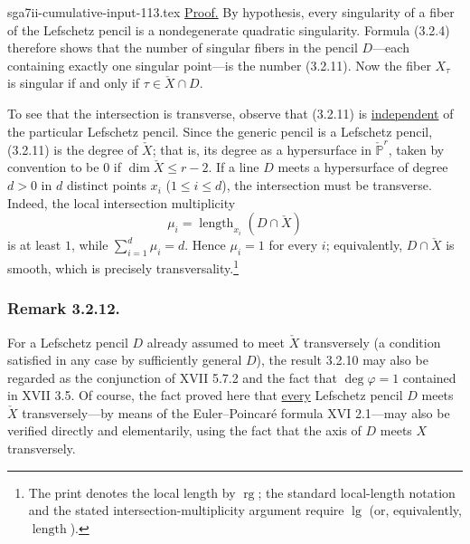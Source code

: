 \begin{filecontents*}{sga7ii-cumulative-input-113.tex}
\underline{Proof.}
By hypothesis, every singularity of a fiber of the Lefschetz pencil is a
nondegenerate quadratic singularity.  Formula (3.2.4) therefore shows that
the number of singular fibers in the pencil $D$---each containing exactly
one singular point---is the number (3.2.11).  Now the fiber $X_\tau$ is
singular if and only if $\tau\in\check X\cap D$.

To see that the intersection is transverse, observe that (3.2.11) is
\underline{independent} of the particular Lefschetz pencil.  Since the
generic pencil is a Lefschetz pencil, (3.2.11) is the degree of $\check X$;
that is, its degree as a hypersurface in $\check{\mathbb P}^{r}$, taken by
convention to be $0$ if $\dim\check X\le r-2$.  If a line $D$ meets a
hypersurface of degree $d>0$ in $d$ distinct points $x_i$
($1\le i\le d$), the intersection must be transverse.  Indeed, the local
intersection multiplicity
\[
\mu_i=\operatorname{length}_{x_i}(D\cap\check X)
\]
is at least $1$, while $\sum_{i=1}^d\mu_i=d$.  Hence $\mu_i=1$ for every
$i$; equivalently, $D\cap\check X$ is smooth, which is precisely
transversality.\footnote{The print denotes the local length by
$\operatorname{rg}$; the standard local-length notation and the stated
intersection-multiplicity argument require $\operatorname{lg}$ (or,
equivalently, $\operatorname{length}$).}

\subsubsection*{Remark 3.2.12.}
For a Lefschetz pencil $D$ already assumed to meet $\check X$ transversely
(a condition satisfied in any case by sufficiently general $D$), the
result 3.2.10 may also be regarded as the conjunction of XVII 5.7.2 and
the fact that $\deg\varphi=1$ contained in XVII 3.5.  Of course, the fact
proved here that \underline{every} Lefschetz pencil $D$ meets $\check X$
transversely---by means of the Euler--Poincar\'e formula XVI 2.1---may also
be verified directly and elementarily, using the fact that the axis of
$D$ meets $X$ transversely.
\end{filecontents*}
